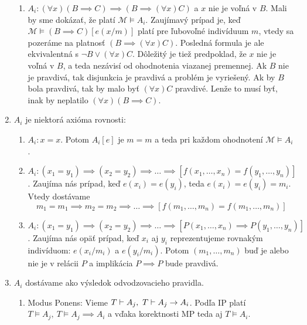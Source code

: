 \begin{dokaz}
\begin{enumerate}
\begin{enumerate}
        \item $A_i: (\forall x) (B \implies C) \implies (B \implies
            (\forall x) C)$ a $x$ nie je voľná v $B$.
            Mali by sme dokázať, že platí $\mathcal{M} \models A_i$.
            Zaujímavý prípad je, keď
            $\mathcal{M} \models (B \implies C)[e(x/m)]$ platí pre
            ľubovoľné indivíduum $m$, vtedy sa
            pozeráme na platnosť $(B \implies (\forall x)C)$.
            Posledná formula je ale ekvivalentná s $\neg B \lor (\forall x) C$.
            Dôležitý je tiež predpoklad, že $x$ nie je voľná v $B$,
            a teda nezávisí od ohodnotenia viazanej premennej.
            Ak $B$ nie je pravdivá, tak disjunkcia je pravdivá a
            problém je vyriešený.
            Ak by $B$ bola pravdivá, tak by malo byť $(\forall x) C$
            pravdivé. Lenže to musí byť, inak by neplatilo
            $(\forall x) (B \implies C)$.
    \end{enumerate}

    \item $A_i$ je niektorá axióma rovnosti:
    \begin{enumerate}
        \item $A_i: x=x$. Potom $A_i[e]$ je $m=m$ a teda pri každom
            ohodnotení $\mathcal{M} \models A_i$.

        \item $A_i: (x_1 = y_1) \implies (x_2 = y_2) \implies \ldots 
            \implies [f(x_1, \ldots, x_n) = f(y_1, \ldots, y_n)]$.
            Zaujíma nás prípad, keď  $e(x_i) = e(y_i)$, teda
            $e(x_i)=e(y_i)=m_i$. Vtedy dostávame
            \begin{equation*}
              m_1=m_1 \implies m_2=m_2 \implies \ldots
                \implies [f(m_1, \dots, m_n) =f(m_1, \dots, m_n)]
            \end{equation*}

        \item $A_i: (x_1 = y_1) \implies (x_2 = y_2) \implies \ldots 
            \implies [P(x_1, \ldots, x_n) \implies P(y_1, \ldots, y_n)]$.
            Zaujíma nás opäť prípad, keď $x_i$ aj $y_i$ reprezentujeme 
            rovnakým indivíduom: $e(x_i/m_i)$ a $e(y_i/m_i)$.
            Potom $(m_1,\dots,m_n)$ buď je alebo nie je v relácii $P$
            a implikácia $P \implies P$ bude pravdivá.
    \end{enumerate}

    \item $A_i$ dostávame ako výsledok odvodzovacieho pravidla.
        \begin{enumerate}
        \item Modus Ponens:
            Vieme
            $T \provable A_j,\ T \provable A_j \implies A_i$.
            Podľa IP platí
            $T \models A_j,\ T \models A_j \implies A_i$ a vďaka
            korektnosti MP teda aj $T \models A_i$.


\end{enumerate}
\end{enumerate}
\end{dokaz}
